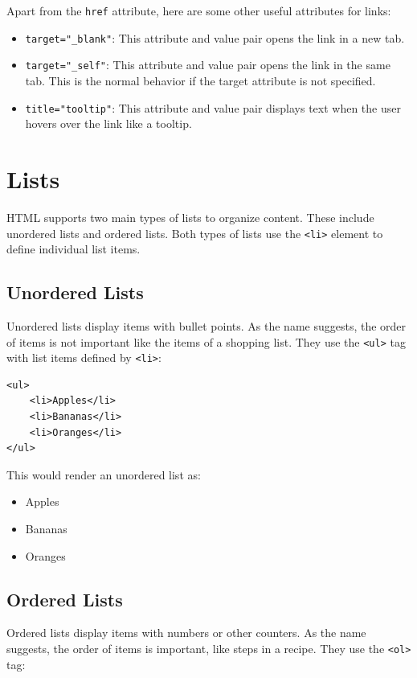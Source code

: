 Apart from the \verb|href| attribute, here are some other useful attributes for links:

\begin{itemize}
    \item \verb|target="_blank"|: This attribute and value pair opens the link in a new tab.
    \item \verb|target="_self"|: This attribute and value pair opens the link in the same tab. This is the normal behavior if the target attribute is not specified.
    \item \verb|title="tooltip"|: This attribute and value pair displays text when the user hovers over the link like a tooltip.
\end{itemize}

\section{Lists}
HTML supports two main types of lists to organize content. These include unordered lists and ordered lists. Both types of lists use the \verb|<li>| element to define individual list items.

\subsection{Unordered Lists}

Unordered lists display items with bullet points. As the name suggests, the order of items is not important like the items of a shopping list. They use the \verb|<ul>| tag
with list items defined by \verb|<li>|:

\begin{verbatim}
<ul>
    <li>Apples</li>
    <li>Bananas</li>
    <li>Oranges</li>
</ul>
\end{verbatim}

This would render an unordered list as:

\begin{itemize}
    \item Apples
    \item Bananas
    \item Oranges
\end{itemize}

\subsection{Ordered Lists}

Ordered lists display items with numbers or other counters. As the name suggests, the order of items is important, like steps in a recipe. They use the
\verb|<ol>| tag:

